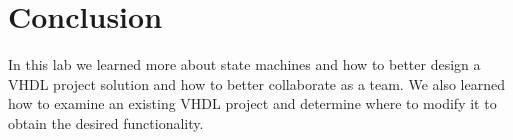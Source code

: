 \documentclass{article}
\begin{document}




\section{Conclusion}
In this lab we learned more about state machines and how to better design a VHDL project solution and how to better collaborate as a team. We also learned how to examine an existing VHDL project and determine where to modify it to obtain the desired functionality.



%

%

\end{document}
